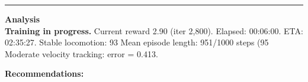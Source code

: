\documentclass[a4paper,10pt]{article}
\begin{document}
\vspace{2pt}
\hrule
\vspace{2pt}

\footnotesize
\textbf{Analysis} \\[1pt]
\textbf{Training in progress.} Current reward 2.90 (iter 2,800).
Elapsed: 00:06:00.
ETA: 02:35:27.
Stable locomotion: 93%
Mean episode length: 951/1000 steps (95%
Moderate velocity tracking: error = 0.413.

\textbf{Recommendations:}
\end{document}
